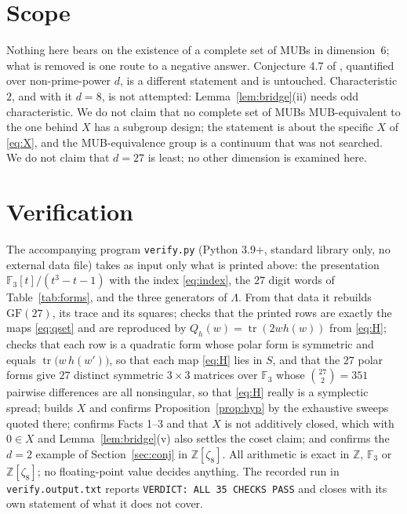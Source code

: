 \documentclass[11pt]{amsart}
\theoremstyle{remark}
\newcommand{\Fq}{\mathbb{F}}
\newcommand{\tr}{\operatorname{tr}}
\newcommand{\GF}{\mathrm{GF}}
\begin{document}
\section{Scope}\label{sec:scope}

Nothing here bears on the existence of a complete set of MUBs in dimension~$6$;
what is removed is one route to a negative answer. Conjecture 4.7 of
\cite{IMEG}, quantified over non-prime-power $d$, is a different statement and is
untouched. Characteristic $2$, and with it $d=8$, is not attempted:
Lemma~\ref{lem:bridge}(ii) needs odd characteristic. We do
not claim that no complete set of MUBs MUB-equivalent to the one behind $X$ has a
subgroup design; the statement is about the specific $X$ of \eqref{eq:X}, and the
MUB-equivalence group is a continuum that was not searched. We do not claim that
$d=27$ is least; no other dimension is examined here.

\section{Verification}\label{sec:verif}

The accompanying program \texttt{verify.py} (Python 3.9+, standard library only,
no external data file) takes as input only what is printed above: the
presentation $\Fq_{3}[t]/(t^{3}-t-1)$ with the index \eqref{eq:index}, the $27$
digit words of Table~\ref{tab:forms}, and the three generators of $\Lambda$. From
that data it rebuilds $\GF(27)$, its trace and its squares; checks that the
printed rows are exactly the maps \eqref{eq:qset} and are reproduced by
$Q_{h}(w)=\tr(2wh(w))$ from \eqref{eq:H}; checks that each row is a quadratic
form whose polar form is symmetric and equals $\tr\bigl(w\,h(w')\bigr)$, so that
each map \eqref{eq:H} lies in $S$, and that the $27$ polar forms give $27$
distinct symmetric $3\times3$ matrices over $\Fq_{3}$ whose $\binom{27}{2}=351$
pairwise differences are all nonsingular, so that \eqref{eq:H} really is a
symplectic spread; builds $X$ and confirms Proposition~\ref{prop:hyp} by the
exhaustive sweeps quoted there; confirms Facts 1--3 and that $X$ is not
additively closed, which with $0\in X$ and Lemma~\ref{lem:bridge}(v) also settles
the coset claim; and confirms the $d=2$ example of Section~\ref{sec:conj} in
$\mathbb Z[\zeta_{8}]$. All arithmetic is exact in
$\mathbb Z$, $\Fq_{3}$ or $\mathbb Z[\zeta_{8}]$; no floating-point value decides
anything. The recorded run in \texttt{verify.output.txt} reports
\texttt{VERDICT: ALL 35 CHECKS PASS} and closes with its own statement of what it
does not cover.
\end{document}
